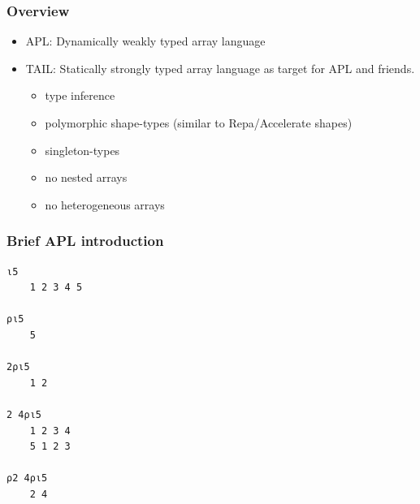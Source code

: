 \documentclass{beamer}
\begin{document}
\begin{frame}
\frametitle{Overview}
\begin{center}
\end{center}

\begin{itemize}
\item APL: Dynamically weakly typed array language
\item TAIL: Statically strongly typed array language as target for APL
  and friends.
  \begin{itemize}
  \item type inference
  \item polymorphic shape-types (similar to Repa/Accelerate shapes)
  \item singleton-types
  \item no nested arrays
  \item no heterogeneous arrays
  \end{itemize}
\end{itemize}

\end{frame}


\begin{frame}[fragile]
\frametitle{Brief APL introduction}


\begin{verbatim}
⍳5
    1 2 3 4 5

⍴⍳5
    5

2⍴⍳5
    1 2

2 4⍴⍳5
    1 2 3 4
    5 1 2 3

⍴2 4⍴⍳5
    2 4
\end{verbatim}

\end{frame}
\end{document}
